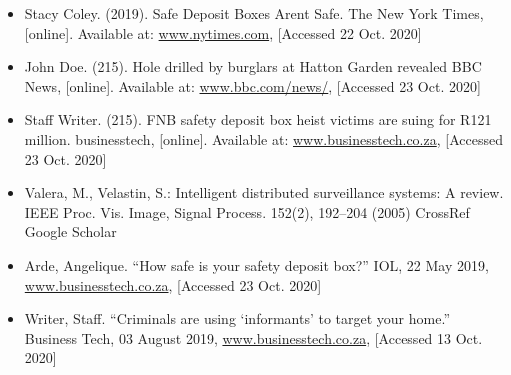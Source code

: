 \documentclass[10pt,sigconf, review]{article}
\begin{document}
\begin{small}
    \begin{itemize}
      \item {Stacy Coley. (2019). Safe Deposit Boxes Aren\textquotesingle t
          Safe. The New York Times, [online]. Available at:
          \href{https://www.nytimes.com/2019/07/19/business/safe-deposit-box-theft.html}
        {\color{blue}www.nytimes.com}, [Accessed 22 Oct. 2020] }

      \item {John Doe. (215). Hole drilled by burglars at Hatton Garden
        revealed BBC News, [online]. Available at:
        \href{https://www.bbc.com/news/uk-england-london-32414531?ocid=socialflow_twitter}
      {\color{blue}www.bbc.com/news/}, [Accessed 23 Oct. 2020] }

      \item {Staff Writer. (215). FNB safety deposit box heist victims are
        suing for R121 million. businesstech, [online]. Available at:
        \href{https://businesstech.co.za/news/banking/272193/fnb-safety-deposit-box-heist-victims-are-suing-for-r121-million/}
      {\color{blue}www.businesstech.co.za}, [Accessed 23 Oct. 2020]}
    

      \item {Valera, M., Velastin, S.: Intelligent distributed surveillance
        systems: A review. IEEE Proc. Vis. Image, Signal Process. 152(2),
      192–204 (2005) CrossRef Google Scholar}

      \item {Arde, Angelique. “How safe is your safety deposit box?” IOL, 22
        May 2019,
        \href{http://www.947.co.za/articles/2019/05/22/safe-deposit-boxes-on-their-way-out}
      {\color{blue}www.businesstech.co.za}, [Accessed 23 Oct. 2020]}

      \item {Writer, Staff. “Criminals are using ‘informants’ to target your
        home.” Business Tech, 03 August 2019,
        \href{      https://businesstech.co.za/news/lifestyle/332493/criminals-are-using-informers-to-target-your-home-heres-what-you-need-to-know/}
      {\color{blue}www.businesstech.co.za}, [Accessed 13 Oct. 2020]}

    \end{itemize}
\end{small}
\end{document}
